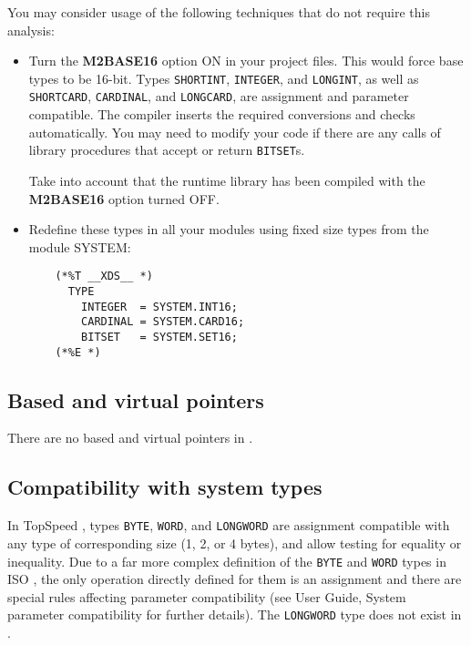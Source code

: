     You may consider usage of the following techniques that do not require 
    this analysis:
    \begin{itemize}
    \item Turn the {\bf M2BASE16} option ON in your project files. This would 
          force base types to be 16-bit. Types \verb'SHORTINT', \verb'INTEGER',
          and \verb'LONGINT', as well as \verb'SHORTCARD', \verb'CARDINAL',
          and \verb'LONGCARD', are assignment and parameter compatible. 
          The compiler inserts the required conversions and checks 
          automatically. You may need to modify your code if there are
          any calls of library procedures that accept or return \verb'BITSET's.

          Take into account that the \xds{} runtime library has been 
          compiled with the {\bf M2BASE16} option turned OFF. 

    \item Redefine these types in all your modules using fixed size types 
          from the module SYSTEM:
\begin{verbatim}
    (*%T __XDS__ *)
      TYPE 
        INTEGER  = SYSTEM.INT16;
        CARDINAL = SYSTEM.CARD16;
        BITSET   = SYSTEM.SET16;
    (*%E *)
\end{verbatim}
    \end{itemize}

\subsection{Based and virtual pointers}

    There are no based and virtual pointers in \xds{}.

\subsection{Compatibility with system types }

    In TopSpeed \mt{}, types \verb'BYTE', \verb'WORD', and \verb'LONGWORD'
    are assignment compatible with any type of corresponding size
    (1, 2, or 4 bytes), and allow testing for equality or inequality.
    Due to a far more complex definition of the \verb'BYTE' and \verb'WORD'
    types in ISO \mt{}, the only operation directly defined for them is an
    assignment and there are special rules affecting parameter compatibility
    (see \xds{} User Guide, System parameter compatibility for further details).
    The \verb'LONGWORD' type does not exist in \xds{}.

